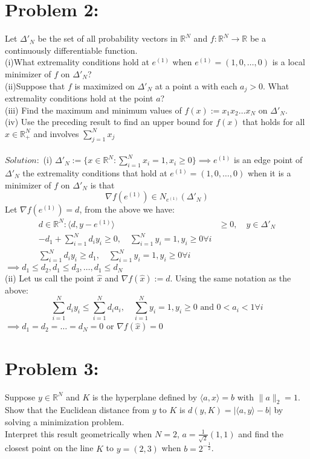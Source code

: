 \documentclass[12pt]{report}
\begin{document}
\section*{Problem 2:}
Let $\Delta'_N$ be the set of all probability vectors in $\mathbb{R}^N$ and
$f:\mathbb{R}^N\rightarrow\mathbb{R}$ be a continuously differentiable function.\\
(i)What extremality conditions hold at $e^{(1)}$ when $e^{(1)}=(1,0,\dots,0)$ is a
local minimizer of $f$ on $\Delta'_N$?\\
(ii)Suppose that $f$ is maximized on $\Delta'_N$ at a point a with each $a_j>0$.
What extremality conditions hold at the point $a$?\\
(iii) Find the maximum and minimum values of $f(x):=x_1x_2\dots x_N$ on $\Delta'_N$.\\
(iv) Use the preceding result to find an upper bound for $f(x)$ that holds for all
$x \in \mathbb{R}^N_+$ and involves $\sum_{j=1}^N x_j$\\
\\
$Solution:$ (i) $\Delta'_N:=\{ x \in \mathbb{R}^N: \sum_{i=1}^N x_i=1, x_i\geq 0 \}
\implies e^{(1)}$ is an edge point of $\Delta'_N$ the extremality conditions that hold
at $e^{(1)}=(1,0,\dots,0)$ when it is a minimizer of $f$ on $\Delta'_N$ is that
$$\nabla f(e^{(1)}) \in N_{e^{(1)}}(\Delta'_N)$$ 
Let $\nabla f(e^{(1)})=d$, from the above we have:
\begin{align*}
d \in \mathbb{R}^N: \langle d, y-e^{(1)} \rangle &\geq 0, \quad y \in \Delta'_N \\
-d_1 + \sum_{i=1}^N d_i y_i \geq 0, \quad \sum_{i=1}^N y_i =1, y_i \geq 0 \forall i \\
\sum_{i=1}^N d_i y_i \geq d_1, \quad \sum_{i=1}^N y_i =1, y_i \geq 0 \forall i 
\end{align*}
$\implies d_1\leq d_2, d_1\leq d_3, \dots ,d_1\leq d_N$
\\
(ii) Let us call the point $\hat{x}$ and $\nabla f(\hat{x}):=d$. Using the same
notation as the above:
$$\sum_{i=1}^Nd_iy_i\leq\sum_{i=1}^N d_i a_i ,\quad\sum_{i=1}^N y_i =1,y_i\geq 0
\text{ and } 0<a_i<1 \forall i $$
$\implies d_1 = d_2 = \dots = d_N = 0$ or $\nabla f(\hat{x})=0$
\\

\section*{Problem 3:}
Suppose $y \in \mathbb{R}^N$ and $K$ is the hyperplane defined by
$\langle a,x \rangle = b$ with $\|a\|_2 = 1$. Show that the Euclidean distance from
$y$ to $K$ is $d(y,K) = |\langle a,y \rangle - b|$ by solving a minimization
problem.\\
Interpret this result geometrically when $N=2$, $a=\frac{1}{\sqrt{2}}(1,1)$ and find
the closest point on the line $K$ to $y = (2, 3)$ when $b = 2^{-\frac{1}{2}}$. \\
\\
\end{document}
